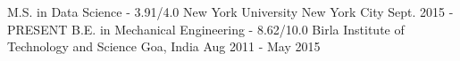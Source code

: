 \begin{cventries}
  \cventry
    {M.S. in Data Science - 3.91/4.0}
    {New York University}
    {New York City}
    {Sept. 2015 - PRESENT}
    {
    }
  \cventry
    {B.E. in Mechanical Engineering - 8.62/10.0}
    {Birla Institute of Technology and Science}
    {Goa, India}
    {Aug 2011 - May 2015}
    {
    }
\end{cventries}
